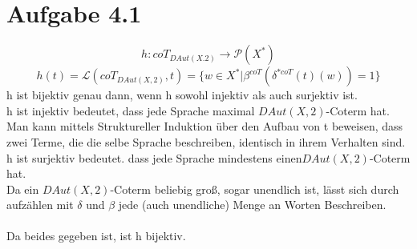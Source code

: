 \section*{Aufgabe 4.1}
\[h:coT_{DAut(X.2)}\rightarrow\mathcal{P}(X^*)\]
\[ h(t)=\mathcal{L}(coT_{DAut(X,2)},t)=\{w\in X^*|\beta^{coT}(\delta^{*coT}(t)(w))=1\}\]
h ist bijektiv genau dann, wenn h sowohl injektiv als auch surjektiv ist.\\
h ist injektiv bedeutet, dass jede Sprache maximal $DAut(X,2)$-Coterm hat.\\
Man kann mittels Struktureller Induktion über den Aufbau von t beweisen, dass zwei Terme, die die selbe Sprache beschreiben, identisch in ihrem Verhalten sind.\\
h ist surjektiv bedeutet. dass jede Sprache mindestens einen$DAut(X,2)$-Coterm hat.\\
Da ein $DAut(X,2)$-Coterm beliebig groß, sogar unendlich ist, lässt sich durch aufzählen mit $\delta$ und $\beta$ jede (auch unendliche) Menge an Worten Beschreiben.\\
\\
Da beides gegeben ist, ist h bijektiv.
